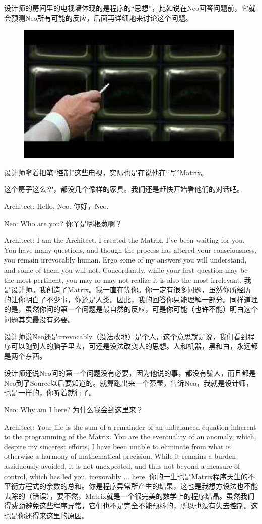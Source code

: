 \documentclass{ctexart}
\begin{document}
设计师的房间里的电视墙体现的是程序的“思想”，比如说在Neo回答问题前，它就会预测Neo所有可能的反应，后面再详细地来讨论这个问题。

\begin{figure}[htb]
\centering
\includegraphics[width=0.5\linewidth]{fig/read_reloaded-158}
\end{figure}

设计师拿着把笔“控制”这些电视，实际也是在说他在“写”Matrix。

这个房子这么空，都没几个像样的家具。我们还是赶快开始看他们的对话吧。

Architect: Hello, Neo. 你好，Neo.

Neo: Who are you? 你丫是哪根葱啊？

Architect: I am the Architect. I created the Matrix. I’ve been waiting for you. You have many questions, and though the process has altered your consciousness, you remain irrevocably human. Ergo some of my answers you will understand, and some of them you will not. Concordantly, while your first question may be the most pertinent, you may or may not realize it is also the most irrelevant. 我是设计师。我创造了Matrix。我一直在等你。你一定有很多问题，虽然你所经历的让你明白了不少事，你还是人类。因此，我的回答你只能理解一部分。同样道理的是，虽然你问的第一个问题是最自然的反应，可是你可能（也许不能）明白这个问题其实最没有必要。

设计师说Neo还是irrevocably（没法改地）是个人，这个意思就是说，我们看到程序可以跑到人的脑子里去，可还是没法改变人的思想。人和机器，黑和白，永远都是两个东西。

设计师还说Neo问的第一个问题没有必要，因为他说的事，都没有骗人，而且都是Neo到了Source以后要知道的。就算跑出来一个茶壶，告诉Neo，我就是设计师，也是一样的，你听着就行了。

Neo: Why am I here? 为什么我会到这里来？

Architect: Your life is the sum of a remainder of an unbalanced equation inherent to the programming of the Matrix. You are the eventuality of an anomaly, which, despite my sincerest efforts, I have been unable to eliminate from what is otherwise a harmony of mathematical precision. While it remains a burden assiduously avoided, it is not unexpected, and thus not beyond a measure of control, which has led you, inexorably ... here. 你的一生也是Matrix程序天生的不平衡方程式的余数的总和。你是程序异常所产生的结果，这也是我想方设法也不能去除的（错误），要不然，Matrix就是一个很完美的数学上的程序结晶。虽然我们得费劲避免这些程序异常，它们也不是完全不能预料的，所以也没有失去控制。这也是你还得来这里的原因。
\end{document}
